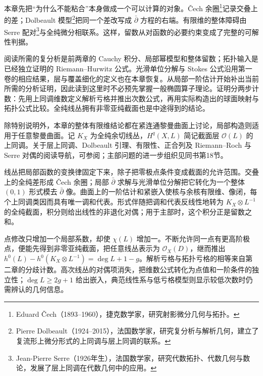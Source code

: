 \ProseParagraphBreak

本章先把“为什么不能粘合”本身做成一个可以计算的对象。Čech 余圈\footnote{Eduard Čech（1893--1960），捷克数学家，研究射影微分几何与拓扑。}记录交叠上的差；Dolbeault 模型\footnote{Pierre Dolbeault（1924--2015），法国数学家，研究复分析与解析几何，建立了复流形上微分形式的上同调与层上同调的联系。}把同一个差改写成 \(\bar\partial\) 方程的右端。有限维的整体障碍由 Serre 配对\footnote{Jean-Pierre Serre（1926年生），法国数学家，研究代数拓扑、代数几何与数论，发展了层上同调在代数几何中的应用。}与全纯微分相联系。这样，留数从对函数的必要约束变成了完整的可解性判据。

\ProseParagraphBreak

阅读所需的复分析是前两章的 Cauchy 积分、局部幂模型和整体留数；拓扑输入是已经独立证明的 Riemann--Hurwitz 公式。光滑单位分解与 Stokes 公式沿用第一卷的相应结果，层与覆盖细化的定义也在本章恢复。从局部一阶估计开始补出当前所需的分析证明，因此读到这里时不必预先掌握一般椭圆算子理论。证明分两步计数：先用上同调维数定义解析亏格并推出次数公式，再用实际构造出的球面映射与拓扑公式比较。全纯线丛拥有非零亚纯截面也是中途得到的结论。

\ProseParagraphBreak

除特别说明外，本章的整体有限维结论都在紧连通黎曼曲面上讨论，局部构造则适用于任意黎曼曲面。记 \(K_X\) 为全纯余切线丛，\(H^q(X,L)\) 简记截面层 \(\mathcal O(L)\) 的上同调。关于层上同调、Dolbeault 引理、有限性、正合列及 Riemann--Roch 与 Serre 对偶的阅读导航，可参阅\parencite[第12--17节]{Forster1981}；主部问题的进一步组织见同书第18节。







\begin{chaptersummary}
	线丛把局部函数的变换律固定下来，除子把零极点条件变成截面的允许范围。交叠上的全纯差形成 Čech 余圈；局部 \(\bar\partial\) 求解与光滑单位分解把它转化为一个整体 \((0,1)\) 形式模去 \(\bar\partial\) 像。曲面上的一阶估计和紧嵌入使核与余核有限维、像闭，每个上同调类因而具有唯一调和代表。形式伴随把调和代表反线性地转为 \(K_X\otimes L^{-1}\) 的全纯截面，积分则给出线性的非退化对偶；用于主部时，这个积分正是留数之和。

	\ProseParagraphBreak

	点修改只增加一个局部系数，却使 \(\chi(L)\) 增加一。不断允许同一点有更高阶极点，便能先得到非零亚纯截面，把任意线丛表示为 \(\mathcal O_X(D)\)，继而推出 \(h^0(L)-h^0(K_X\otimes L^{-1})=\deg L+1-g\)。解析亏格与拓扑亏格的相等来自第二章的分歧计数。高次线丛的对偶项消失，把维数公式转化为点值和一阶条件的独立性；\(\deg L\ge2g+1\) 给出嵌入，典范线性系与低亏格模型则显示较低次数时仍需辨认的几何信息。
\end{chaptersummary}

